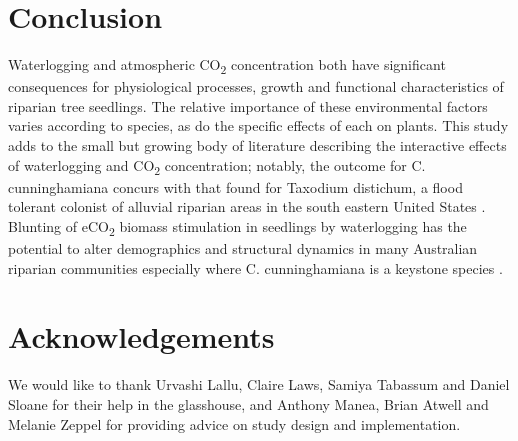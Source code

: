 \documentclass[12pt,a4paper]{memoir}
\begin{document}
\section{Conclusion}
Waterlogging and atmospheric CO\textsubscript{2} concentration both have significant consequences for physiological processes, growth and functional characteristics of riparian tree seedlings. The relative importance of these environmental factors varies according to species, as do the specific effects of each on plants. This study adds to the small but growing body of literature describing the interactive effects of waterlogging and CO\textsubscript{2} concentration; notably, the outcome for C. cunninghamiana concurs with that found for Taxodium distichum, a flood tolerant colonist of alluvial riparian areas in the south eastern United States \citep{Megonigal2005}. Blunting of eCO\textsubscript{2} biomass stimulation in seedlings by waterlogging has the potential to alter demographics and structural dynamics in many Australian riparian communities especially where C. cunninghamiana is a keystone species \citep{Woolfrey2001}.

\section*{Acknowledgements}
We would like to thank Urvashi Lallu, Claire Laws, Samiya Tabassum and Daniel Sloane for their help in the glasshouse, and Anthony Manea, Brian Atwell and Melanie Zeppel for providing advice on study design and implementation.

\renewcommand\bibname{{References}} 
\begin{small}


\end{small}
\end{document}
